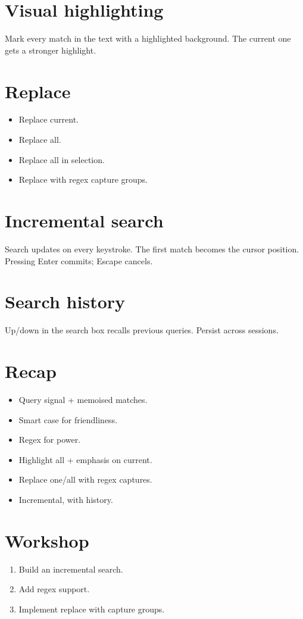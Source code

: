 \section{Visual highlighting}

Mark every match in the text with a highlighted
background. The current one gets a stronger highlight.

\section{Replace}

\begin{itemize}[leftmargin=*]
  \item Replace current.
  \item Replace all.
  \item Replace all in selection.
  \item Replace with regex capture groups.
\end{itemize}

\section{Incremental search}

Search updates on every keystroke. The first match becomes
the cursor position. Pressing Enter commits; Escape
cancels.

\section{Search history}

Up/down in the search box recalls previous queries. Persist
across sessions.

\section{Recap}

\begin{recap}
\begin{itemize}[leftmargin=*]
  \item Query signal + memoised matches.
  \item Smart case for friendliness.
  \item Regex for power.
  \item Highlight all + emphasis on current.
  \item Replace one/all with regex captures.
  \item Incremental, with history.
\end{itemize}
\end{recap}

\section*{Workshop}

\begin{enumerate}[leftmargin=*]
  \item Build an incremental search.
  \item Add regex support.
  \item Implement replace with capture groups.
\end{enumerate}
